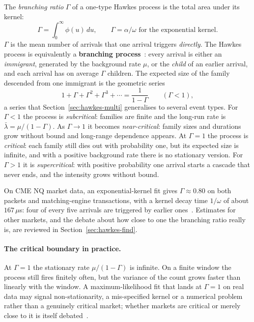 The \emph{branching ratio} $\Gamma$ of a one-type Hawkes process is the total area under its kernel:
\[
  \Gamma = \int_0^\infty \phi(u)\, du, \qquad \Gamma = \alpha/\omega \text{ for the exponential kernel}.
\]
$\Gamma$ is the mean number of arrivals that one arrival triggers \emph{directly}. The Hawkes process
is equivalently a \textbf{branching process}~\citep{hawkesoakes1974}: every arrival is either an
\emph{immigrant}, generated by the background rate $\mu$, or the \emph{child} of an earlier arrival,
and each arrival has on average $\Gamma$ children. The expected size of the family descended from one
immigrant is the geometric series
\[
  1 + \Gamma + \Gamma^2 + \Gamma^3 + \cdots = \frac{1}{1 - \Gamma} \qquad (\Gamma < 1),
\]
a series that Section~\ref{sec:hawkes-multi} generalises to several event types. For
$\Gamma < 1$ the process is \emph{subcritical}: families are finite and the long-run rate is
$\bar\lambda = \mu / (1 - \Gamma)$. As $\Gamma \to 1$ it becomes \emph{near-critical}: family sizes
and durations grow without bound and long-range dependence appears. At $\Gamma = 1$ the process is
\emph{critical}: each family still dies out with probability one, but its expected size is infinite,
and with a positive background rate there is no stationary version. For $\Gamma > 1$ it is
\emph{supercritical}: with positive probability one arrival starts a cascade that never ends, and the
intensity grows without bound.

On CME NQ market data, an exponential-kernel fit gives $\Gamma \approx 0.80$ on both packets and
matching-engine transactions, with a kernel decay time $1/\omega$ of about $167\,\mu$s: four of every
five arrivals are triggered by earlier ones~\citep{maciejewski2026packets}. Estimates for other markets,
and the debate about how close to one the branching ratio really is, are reviewed in
Section~\ref{sec:hawkes-find}.

\paragraph{The critical boundary in practice.} At $\Gamma = 1$ the stationary rate
$\mu/(1-\Gamma)$ is infinite. On a finite window the process still fires finitely often, but the
variance of the count grows faster than linearly with the window. A maximum-likelihood fit that
lands at $\Gamma = 1$ on real data may signal non-stationarity, a mis-specified kernel or a numerical
problem rather than a genuinely critical market; whether markets are critical or merely close to it is
itself debated~\citep{hardimanbercotbouchaud2013,filimonovsornette2015}.

